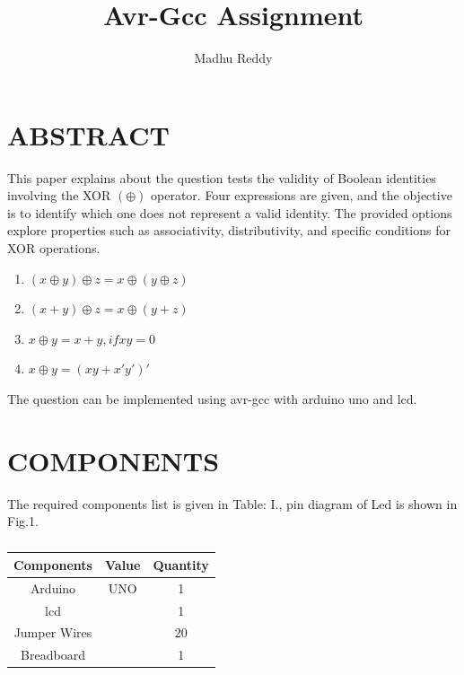 \documentclass[conference]{IEEEtran}
\title{
\vspace{1cm}
{ Avr-Gcc Assignment}}
\author{Madhu Reddy}
\begin{document}
\maketitle
 \section{ABSTRACT}

 This paper explains about the question tests the validity of Boolean identities involving the XOR $(\oplus)$ operator. Four expressions are given, and the objective is to identify which one does not represent a valid identity. The provided options explore properties such as associativity, distributivity, and specific conditions for XOR operations.
\begin{enumerate}
\item  $(x \oplus y) \oplus
 z = x  \oplus (y \oplus z) $ 
\item  $(x + y)  \oplus z = x  \oplus
  (y + z)$
\item  $ x \oplus y = x + y, if xy=0 $
\item  $ x \oplus y = ( xy +x'y' )' $
\end{enumerate}
The question can be implemented using avr-gcc with arduino uno and lcd.

\section{COMPONENTS} 

The required components list is given in Table: I., pin diagram of Led is shown in Fig.1.
\vspace{0.1cm}
 \begin{table} [htbp]
\centering
\begin{tabular}{| c | c | c |} \hline
Components & Value & Quantity \\\hline
Arduino & UNO & 1 \\ \hline
lcd &  & 1 \\ \hline
Jumper Wires &  & 20 \\ \hline
Breadboard & & 1 \\ 
\hline
\end{tabular}
\vspace{0.1cm}
\caption{\label{tab:widgets}}
\end{table}
\end{document}
